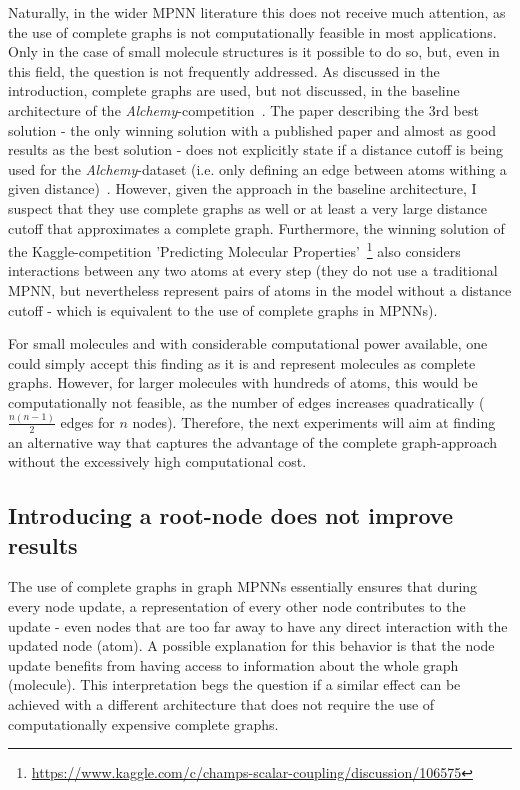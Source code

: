 Naturally, in the wider MPNN literature this does not receive much attention, as the use of complete graphs is not computationally feasible in most applications. Only in the case of small molecule structures is it possible to do so, but, even in this field, the question is not frequently addressed. As discussed in the introduction, complete graphs are used, but not discussed, in the baseline architecture of the \textit{Alchemy}-competition~\cite{Chen2019}. The paper describing the 3rd best solution - the only winning solution with a published paper and almost as good results as the best solution - does not explicitly state if a distance cutoff is being used for the \textit{Alchemy}-dataset (i.e. only defining an edge between atoms withing a given distance)~\cite{Klicpera2019}. However, given the approach in the baseline architecture, I suspect that they use complete graphs as well or at least a very large distance cutoff that approximates a complete graph. Furthermore, the winning solution of the Kaggle-competition 'Predicting Molecular Properties'~\footnote{\url{https://www.kaggle.com/c/champs-scalar-coupling/discussion/106575}} also considers interactions between any two atoms at every step (they do not use a traditional MPNN, but nevertheless represent pairs of atoms in the model without a distance cutoff - which is equivalent to the use of complete graphs in MPNNs).

For small molecules and with considerable computational power available, one could simply accept this finding as it is and represent molecules as complete graphs. However, for larger molecules with hundreds of atoms, this would be computationally not feasible, as the number of edges increases quadratically ($\frac{n(n - 1)}{2}$ edges for $n$ nodes). Therefore, the next experiments will aim at finding an alternative way that captures the advantage of the complete graph-approach without the excessively high computational cost.





\subsection{Introducing a root-node does not improve results}
\label{sec:root-node}


The use of complete graphs in graph MPNNs essentially ensures that during every node update, a representation of every other node contributes to the update - even nodes that are too far away to have any direct interaction with the updated node (atom).
A possible explanation for this behavior is that the node update benefits from having access to information about the whole graph (molecule). This interpretation begs the question if a similar effect can be achieved with a different architecture that does not require the use of computationally expensive complete graphs.

